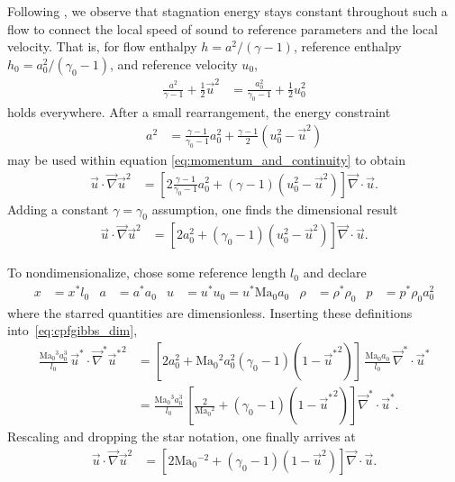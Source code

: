 \documentclass[letterpaper,11pt,nointlimits,reqno]{amsart}
\newcommand{\Mach}[1][]{\mbox{Ma}_{#1}}
\begin{document}
Following \citeauthor{Saad2011Coordinate}, we observe that stagnation energy
stays constant throughout such a flow to connect the local speed of sound to
reference parameters and the local velocity.  That is, for flow enthalpy $h =
a^2 / \left(\gamma-1\right)$, reference enthalpy $h_0 = a_0^2 /
\left(\gamma_0-1\right)$, and reference velocity $u_0$,
\begin{align}
        \frac{a^2  }{\gamma  -1} + \frac{1}{2} \vec{u}^2
     &= \frac{a_0^2}{\gamma_0-1} + \frac{1}{2} u_0^2
\end{align}
holds everywhere.  After a small rearrangement, the energy constraint
\begin{align}
        a^2
     &=   \frac{\gamma-1}{\gamma_0-1} a_0^2
        + \frac{\gamma-1}{2} \left(u_0^2 - \vec{u}^2\right)
\label{eq:stagnation_sound}
\end{align}
may be used within equation \eqref{eq:momentum_and_continuity} to obtain
\begin{align}
       \vec{u}\cdot \vec{\nabla}\vec{u}^2
    &= \left[
          2 \frac{\gamma-1}{\gamma_0-1} a_0^2
        + \left(\gamma-1\right) \left(u_0^2 - \vec{u}^2\right)
       \right]\vec{\nabla}\cdot\vec{u}
.
\end{align}
Adding a constant $\gamma=\gamma_0$ assumption, one finds the dimensional result
\begin{align}
       \vec{u}\cdot \vec{\nabla}\vec{u}^2
    &= \left[
          2 a_0^2
        + \left(\gamma_0-1\right) \left(u_0^2 - \vec{u}^2\right)
       \right]\vec{\nabla}\cdot\vec{u}
\label{eq:cpfgibbs_dim}
.
\end{align}

To nondimensionalize, chose some reference length $l_0$ and declare
\begin{align}
    x     &= x^\ast l_0
&   a     &= a^\ast a_0
&   u     &= u^\ast u_0 = u^\ast \Mach[0] a_0
&   \rho  &= \rho^\ast \rho_0
&   p     &= p^\ast \rho_0 a_0^2
\label{eq:nondimensionalization}
\end{align}
where the starred quantities are dimensionless.  Inserting these definitions
into~\eqref{eq:cpfgibbs_dim},
\begin{align}
       \frac{\Mach[0]{}^3 a_0^3}{l_0}
       \,
       \vec{u}^\ast \cdot \vec{\nabla}^\ast{\vec{u}^\ast}^2
    &=
       \left[
          2 a_0^2
        + \Mach[0]{}^2 a_0^2 \left(\gamma_0-1\right) \left(1 - {\vec{u}^\ast}^2\right)
       \right]
       \,
       \frac{\Mach[0]{} a_0}{l_0}
       \,
       \vec{\nabla}^\ast\cdot\vec{u}^\ast
\\
    &=
       \frac{\Mach[0]{}^3 a_0^3}{l_0}
       \,
       \left[
          \frac{2}{\Mach[0]{}^2}
        + \left(\gamma_0-1\right) \left(1 - {\vec{u}^\ast}^2\right)
       \right]
       \vec{\nabla}^\ast\cdot\vec{u}^\ast
.
\end{align}
Rescaling and dropping the star notation, one finally arrives at
\begin{align}
       \vec{u} \cdot \vec{\nabla}\vec{u}^2
    &=
       \left[
          2 \Mach[0]{}^{-2}
        + \left(\gamma_0-1\right) \left(1 - \vec{u}^2\right)
       \right]
       \vec{\nabla}\cdot\vec{u}
\label{eq:cpfgibbs_nondim}
.
\end{align}
\end{document}
